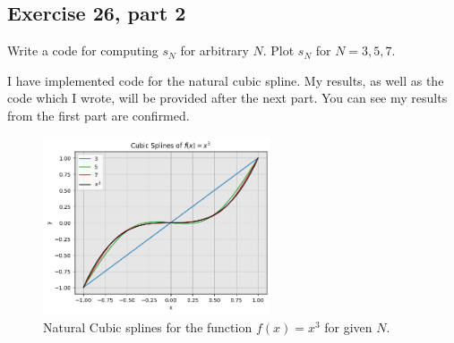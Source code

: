 \newpage
\subsection{Exercise 26, part 2}
Write a code for computing $s_N$ for arbitrary $N$. Plot $s_N$ for $N = 3, 5, 7$. 
\partbreak
\begin{solution}

    I have implemented code for the natural cubic spline. My results, as well as the code which I wrote, will be provided after the next part. You can see my results from the first part are confirmed.

\end{solution}
\vspace{1in}
\begin{figure}[!ht]
    \centering
    \includegraphics[width = 0.6\textwidth]{Plots/Exercise 26a.png}
    \caption{Natural Cubic splines for the function $f(x) = x^3$ for given $N$.}
    \label{fig:Exercise 26a}
\end{figure}

\newpage
